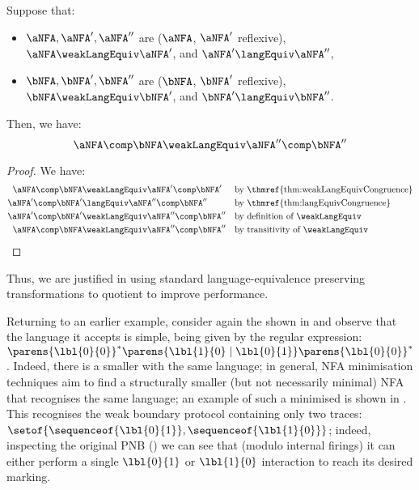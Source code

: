 \begin{theorem}
    Suppose that:
    \begin{itemize}
        \item $\aNFA, \aNFA', \aNFA''$ are \NFAB{\aN}{\bN} ($\aNFA$, $\aNFA'$
            reflexive), $\aNFA \weakLangEquiv \aNFA'$, and $\aNFA' \langEquiv
            \aNFA''$,
        \item $\bNFA, \bNFA', \bNFA''$ are \NFAB{\bN}{\cN} ($\bNFA$, $\bNFA'$
            reflexive), $\bNFA \weakLangEquiv \bNFA'$, and $\bNFA' \langEquiv
            \bNFA''$.
    \end{itemize}
    Then, we have:
    \[
        \aNFA \comp \bNFA \weakLangEquiv \aNFA'' \comp \bNFA''
    \]
\end{theorem}
\begin{proof}
    We have:
    \begin{align*}
        \aNFA \comp \bNFA &\weakLangEquiv \aNFA' \comp \bNFA' && \text{by
            \thmref{thm:weakLangEquivCongruence}}\\
        \aNFA' \comp \bNFA' &\langEquiv \aNFA'' \comp \bNFA'' && \text{by
            \thmref{thm:langEquivCongruence}}\\
        \aNFA' \comp \bNFA' &\weakLangEquiv \aNFA'' \comp \bNFA'' && \text{by
            definition of $\weakLangEquiv$} \\
        \aNFA \comp \bNFA &\weakLangEquiv \aNFA'' \comp \bNFA'' && \text{by
            transitivity of $\weakLangEquiv$}
    \end{align*}
\end{proof}

Thus, we are justified in using standard language-equivalence preserving
transformations to quotient \tauClosed{} \TNFA{} to improve performance.

Returning to an earlier example, consider again the \tauClosed{} \TNFA{} shown in
 and observe that the language it accepts is simple, being given by the
regular expression:
$\parens{\lbl{0}{0}}^\ast\parens{\lbl{1}{0}\mid\lbl{0}{1}}\parens{\lbl{0}{0}}^\ast$.  Indeed, there
is a smaller \TNFA{} with the same language; in general, NFA minimisation techniques aim to find a
structurally smaller (but not necessarily minimal) NFA that recognises the same language; an
example of such a minimised \TNFA{} is shown in .  This \TNFA{}
recognises the weak boundary protocol containing only two traces: $\setof{\sequenceof{\lbl{0}{1}},
\sequenceof{\lbl{1}{0}}}$; indeed, inspecting the original PNB () we can see
that (modulo internal firings) it can either perform a single $\lbl{0}{1}$ or $\lbl{1}{0}$
interaction to reach its desired marking.

